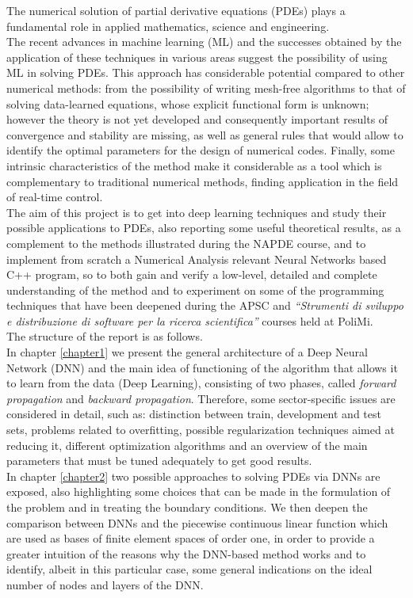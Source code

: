 \documentclass[12pt, a4paper]{report}
\theoremstyle{definition}
\begin{document}
The numerical solution of partial derivative equations (PDEs) plays a fundamental role in applied mathematics, science and engineering. \\
The recent advances in machine learning (ML) and the successes obtained by the application of these techniques in various areas suggest the possibility of using ML in solving PDEs. This approach has considerable potential compared to other numerical methods: from the possibility of writing mesh-free algorithms to that of solving data-learned equations, whose explicit functional form is unknown; however the theory is not yet developed and consequently important results of convergence and stability are missing, as well as general rules that would allow to identify the optimal parameters for the design of numerical codes. Finally, some intrinsic characteristics of the method make it considerable as a  tool which is complementary to traditional numerical methods, finding application in the field of real-time control. \\
The aim of this project is to get into deep learning techniques and study their  possible applications to PDEs, also reporting some useful theoretical results, as a complement to the methods illustrated during the NAPDE course, and to implement from scratch a Numerical Analysis relevant Neural Networks based C++ program, so to both gain and verify a low-level, detailed and complete understanding of the method and to experiment on some of the programming techniques that have been deepened during the APSC and \textit{``Strumenti di sviluppo e distribuzione di software per la ricerca scientifica''} courses held at PoliMi.\\
The structure of the report is as follows.\\
In chapter \ref{chapter1} we present the general architecture of a Deep Neural Network (DNN) and the main idea of functioning of the algorithm that allows it to learn from the data (Deep Learning), consisting of two phases, called \textit{forward propagation} and \textit{backward propagation}. Therefore, some  sector-specific issues are considered in detail, such as: distinction between train, development and test sets, problems related to overfitting, possible regularization techniques aimed at reducing it, different optimization algorithms and an overview of the main parameters that must be tuned adequately to get good results.\\
In chapter \ref{chapter2} two possible approaches to solving PDEs via DNNs are exposed, also highlighting some choices that can be made in the formulation of the problem and in treating the boundary conditions. We then deepen the comparison between DNNs and the piecewise continuous linear function which are used as bases of finite element spaces of order one, in order to provide a greater intuition of the reasons why the DNN-based method works and to identify, albeit in this particular case, some general indications on the ideal number of nodes and layers of the DNN.\\
\end{document}
